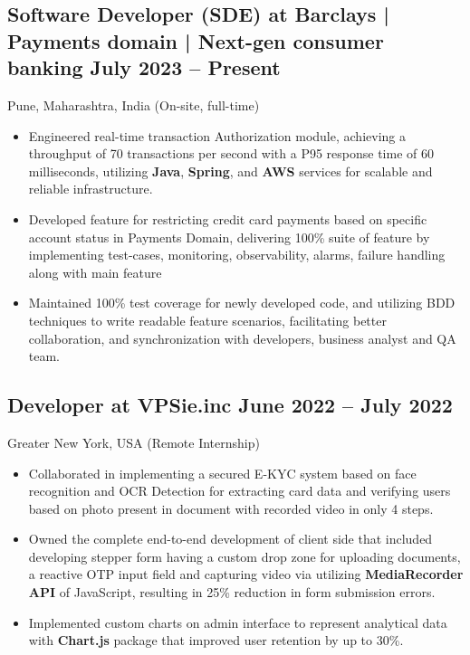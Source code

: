 \documentclass[a4,10pt]{article}
\newcommand{\subtext}[1]{
#1\par\vspace{-0.2cm}}
\newenvironment{zitemize}{
\begin{itemize}\itemsep0pt \parskip0pt \parsep1pt}
{\end{itemize}\vspace{-0.5cm}}
\begin{document}
\subsection*{Software Developer (SDE) at Barclays | Payments domain | Next-gen consumer banking \hfill July 2023 -- Present} 
\subtext{Pune, Maharashtra, India {\normalsize\normalfont (On-site, full-time) }} 
    \begin{zitemize}
        \item Engineered real-time transaction Authorization module, achieving a throughput of 70 transactions per second with a P95
        response time of 60 milliseconds, utilizing \textbf{Java}, \textbf{Spring}, and \textbf{AWS} services for scalable and reliable
        infrastructure.
        \item Developed feature for restricting credit card payments based on specific account status in Payments Domain, delivering 100\% suite of feature by implementing test-cases, monitoring, observability, alarms, failure handling along with main feature 
        \item Maintained 100\% test coverage for newly developed code, and utilizing BDD techniques to write readable feature scenarios, facilitating better collaboration, and synchronization with developers, business analyst and QA team.
    \end{zitemize}

\subsection*{Developer at VPSie.inc \hfill June 2022 -- July 2022} 
\subtext{Greater New York, USA {\normalsize\normalfont (Remote Internship) }} 
    \begin{zitemize}
        \item Collaborated in implementing a secured E-KYC system based on face recognition and OCR Detection for extracting card data and verifying users based on photo present in document with recorded video in only 4 steps.
        \item Owned the complete end-to-end development of client side that included developing stepper form having a custom drop zone for uploading documents, a reactive OTP input field and capturing video via utilizing \textbf{MediaRecorder API} of JavaScript, resulting in 25\% reduction in form submission errors.
        \item Implemented custom charts on admin interface to represent analytical data with \textbf{Chart.js} package that improved user retention by up to 30\%.
    \end{zitemize}
\end{document}
